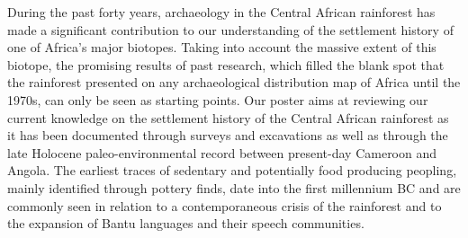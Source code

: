 \documentclass[a0]{sciposter}
\begin{document}
{\begin{minipage}[t][102cm][t]{82cm}
\vspace{2cm}\hspace{2cm}\begin{minipage}[t]{24.5cm}
{\fontsize{28}{36} \selectfont During the past forty years, archaeology in the Central African rainforest has made a significant contribution to our understanding of the settlement history of one of Africa's major biotopes. Taking into account the massive extent of this biotope, the promising results of past research, which filled the blank spot that the rainforest presented on any archaeological distribution map of Africa until the 1970s, can only be seen as starting points. Our poster aims at reviewing our current knowledge on the settlement history of the Central African rainforest as it has been documented through surveys and excavations as well as through the late Holocene paleo-environmental record between present-day Cameroon and Angola.}
\bigbreak
{\fontsize{28}{36} \selectfont The earliest traces of sedentary and potentially food producing peopling, mainly identified through pottery finds, date into the first millennium BC and are commonly seen in relation to a contemporaneous crisis of the rainforest and to the expansion of Bantu languages and their speech communities.}
\end{minipage}

\vspace{5cm}
\hspace{2cm}\begin{minipage}[t]{77cm}
\begin{multicols}{3}


\end{multicols}
\end{minipage}
\end{minipage}}
\end{document}
